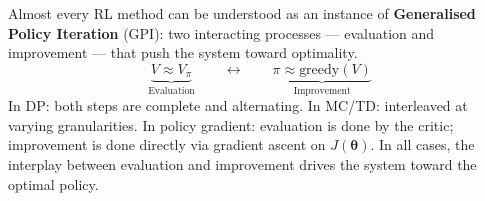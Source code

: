 \documentclass[11pt,a4paper]{article}
\newcommand{\term}[1]{\textcolor{DefGreen}{\textbf{#1}}}
\begin{document}
\begin{insightbox}
Almost every RL method can be understood as an instance of \term{Generalised Policy Iteration} (GPI): two interacting processes --- evaluation and improvement --- that push the system toward optimality.
\[
\underbrace{V \approx V_\pi}_{\text{Evaluation}} \qquad\longleftrightarrow\qquad \underbrace{\pi \approx \text{greedy}(V)}_{\text{Improvement}}
\]
In DP: both steps are complete and alternating. In MC/TD: interleaved at varying granularities. In policy gradient: evaluation is done by the critic; improvement is done directly via gradient ascent on $J(\boldsymbol{\theta})$. In all cases, the interplay between evaluation and improvement drives the system toward the optimal policy.
\end{insightbox}
\end{document}

